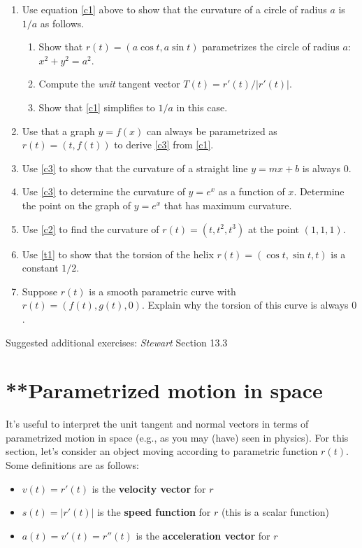 \documentclass[12pt]{article}
\numberwithin{equation}{subsection}
\numberwithin{figure}{subsection}
\theoremstyle{note}
\begin{document}
{\begin{enumerate}[label=\arabic*.]
\item Use equation \eqref{c1} above to show that the curvature of a circle of radius $a$ is $1/a$ as follows.
\begin{enumerate}
	\item Show that $r(t)=(a\cos t, a\sin t)$ parametrizes the circle of radius $a$: $x^2+y^2=a^2$.
	\item Compute the \textit{unit} tangent vector $T(t)=r'(t)/|r'(t)|$.
	\item Show that \eqref{c1} simplifies to $1/a$ in this case. 
\end{enumerate}

\item Use that a graph $y=f(x)$ can always be parametrized as $r(t)=(t,f(t))$ to derive \eqref{c3} from \eqref{c1}.
\item Use \eqref{c3} to show that the curvature of a straight line $y=mx+b$ is always $0$. 

\item Use \eqref{c3} to determine the curvature of $y=e^x$ as a function of $x$. Determine the point on the graph of $y=e^x$ that has maximum curvature.

\item Use \eqref{c2} to find the curvature of $r(t)=(t,t^2,t^3)$ at the point $(1,1,1)$. 


\item Use \eqref{t1} to show that the torsion of the helix $r(t)=(\cos t, \sin t, t)$ is a constant $1/2$. 

\item Suppose $r(t)$ is a smooth parametric curve with $r(t)=(f(t), g(t),0)$. Explain why the torsion of this curve is always $0$. 
\end{enumerate}

Suggested additional exercises: \textit{Stewart} Section 13.3 


\section{**Parametrized motion in space}
It's useful to interpret the unit tangent and normal vectors in terms of parametrized motion in space (e.g., as you may (have) seen in physics). For this section, let's consider an object moving according to parametric function $r(t)$. Some definitions are as follows:
\begin{itemize} 
	\item  $v(t)=r'(t)$ is the  \textbf{velocity vector} for $r$ 
	\item $s(t)=|r'(t)|$ is the \textbf{speed function} for $r$ (this is a scalar function)
	\item  $a(t)=v'(t)=r''(t)$ is the \textbf{acceleration vector} for $r$
\end{itemize}


}
\end{document}
